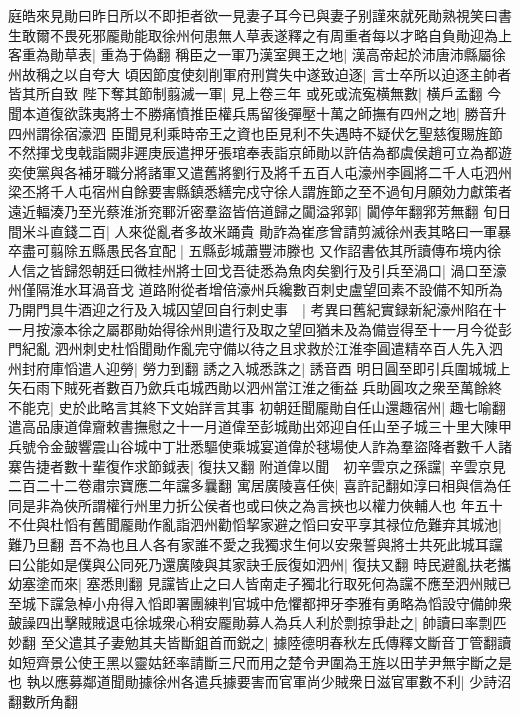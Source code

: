 庭皓來見勛曰昨日所以不即拒者欲一見妻子耳今已與妻子别謹來就死勛熟視笑曰書生敢爾不畏死邪龎勛能取徐州何患無人草表遂釋之有周重者每以才略自負勛迎為上客重為勛草表|{
	重為于偽翻}
稱臣之一軍乃漢室興王之地|{
	漢高帝起於沛唐沛縣屬徐州故稱之以自夸大}
頃因節度使刻削軍府刑賞失中遂致迫逐|{
	言士卒所以迫逐主帥者皆其所自致}
陛下奪其節制翦滅一軍|{
	見上卷三年}
或死或流寃横無數|{
	横戶孟翻}
今聞本道復欲誅夷將士不勝痛憤推臣權兵馬留後彈壓十萬之師撫有四州之地|{
	勝音升四州謂徐宿濠泗}
臣聞見利乘時帝王之資也臣見利不失遇時不疑伏乞聖慈復賜旌節不然揮戈曳戟詣闕非遲庚辰遣押牙張琯奉表詣京師勛以許佶為都虞侯趙可立為都遊奕使黨與各補牙職分將諸軍又遣舊將劉行及將千五百人屯濠州李圓將二千人屯泗州梁丕將千人屯宿州自餘要害縣鎮悉繕完戍守徐人謂旌節之至不過旬月願効力獻策者遠近輻湊乃至光蔡淮浙兖鄆沂密羣盜皆倍道歸之闐溢郛郭|{
	闐停年翻郛芳無翻}
旬日間米斗直錢二百|{
	人來從亂者多故米踊貴}
勛詐為崔彦曾請剪滅徐州表其略曰一軍暴卒盡可翦除五縣愚民各宜配|{
	五縣彭城蕭豐沛滕也}
又作詔書依其所讀傳布境内徐人信之皆歸怨朝廷曰微桂州將士回戈吾徒悉為魚肉矣劉行及引兵至渦口|{
	渦口至濠州僅隔淮水耳渦音戈}
道路附從者增倍濠州兵纔數百刺史盧望回素不設備不知所為乃開門具牛酒迎之行及入城囚望回自行刺史事　|{
	考異曰舊紀實録新紀濠州陷在十一月按濠本徐之屬郡勛始得徐州則遣行及取之望回猶未及為備豈得至十一月今從彭門紀亂}
泗州刺史杜慆聞勛作亂完守備以待之且求救於江淮李圓遣精卒百人先入泗州封府庫慆遣人迎勞|{
	勞力到翻}
誘之入城悉誅之|{
	誘音酉}
明日圓至即引兵圍城城上矢石雨下賊死者數百乃歛兵屯城西勛以泗州當江淮之衝益兵助圓攻之衆至萬餘終不能克|{
	史於此略言其終下文始詳言其事}
初朝廷聞龎勛自任山還趣宿州|{
	趣七喻翻}
遣高品康道偉齎敕書撫慰之十一月道偉至彭城勛出郊迎自任山至子城三十里大陳甲兵號令金皷響震山谷城中丁壯悉驅使乘城宴道偉於毬場使人詐為羣盜降者數千人諸寨告捷者數十輩復作求節鉞表|{
	復扶又翻}
附道偉以聞　初辛雲京之孫讜|{
	辛雲京見二百二十二卷肅宗寶應二年讜多曩翻}
寓居廣陵喜任俠|{
	喜許記翻如淳曰相與信為任同是非為俠所謂權行州里力折公侯者也或曰俠之為言挾也以權力俠輔人也}
年五十不仕與杜慆有舊聞龎勛作亂詣泗州勸慆挈家避之慆曰安平享其禄位危難弃其城池|{
	難乃旦翻}
吾不為也且人各有家誰不愛之我獨求生何以安衆誓與將士共死此城耳讜曰公能如是僕與公同死乃還廣陵與其家訣壬辰復如泗州|{
	復扶又翻}
時民避亂扶老攜幼塞塗而來|{
	塞悉則翻}
見讜皆止之曰人皆南走子獨北行取死何為讜不應至泗州賊已至城下讜急棹小舟得入慆即署團練判官城中危懼都押牙李雅有勇略為慆設守備帥衆皷譟四出擊賊賊退屯徐城衆心稍安龎勛募人為兵人利於剽掠爭赴之|{
	帥讀曰率剽匹妙翻}
至父遣其子妻勉其夫皆斷鉏首而鋭之|{
	據陸德明春秋左氏傳釋文斷音丁管翻讀如短齊景公使王黑以靈姑鉟率請斷三尺而用之楚令尹圍為王旌以田芋尹無宇斷之是也}
執以應募鄰道聞勛據徐州各遣兵據要害而官軍尚少賊衆日滋官軍數不利|{
	少詩沼翻數所角翻}
